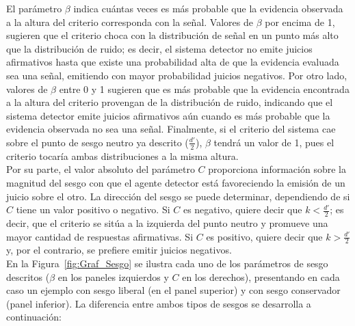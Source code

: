 \begin{itemize}
El parámetro $\beta$ indica cuántas veces es más probable que la evidencia observada a la altura del criterio corresponda con la señal. Valores de $\beta$ por encima de 1, sugieren que el criterio choca con la distribución de señal en un punto más alto que la distribución de ruido; es decir, el sistema detector no emite juicios afirmativos hasta que existe una probabilidad alta de que la evidencia evaluada sea una señal, emitiendo con mayor probabilidad juicios negativos. Por otro lado, valores de $\beta$ entre 0 y 1 sugieren que es más probable que la evidencia encontrada a la altura del criterio provengan de la distribución de ruido, indicando que el sistema detector emite juicios afirmativos aún cuando es más probable que la evidencia observada no sea una señal. Finalmente, si el criterio del sistema cae sobre el punto de sesgo neutro ya descrito ($\frac{d'}{2}$), $\beta$ tendrá un valor de 1, pues el criterio tocaría ambas distribuciones a la misma altura.\\

Por su parte, el valor absoluto del parámetro $C$ proporciona información sobre la magnitud del sesgo con que el agente detector está favoreciendo la emisión de un juicio sobre el otro. La dirección del sesgo se puede determinar, dependiendo de si $C$ tiene un valor positivo o negativo. Si $C$ es negativo, quiere decir que $k < \frac{d'}{2}$; es decir, que el criterio se sitúa a la izquierda del punto neutro y promueve una mayor cantidad de respuestas afirmativas. Si $C$ es positivo, quiere decir que $k > \frac{d'}{2}$ y, por el contrario, se prefiere emitir juicios negativos.\\


En la Figura~\ref{fig:Graf_Sesgo} se ilustra cada uno de los parámetros de sesgo descritos ($\beta$ en los paneles izquierdos y $C$ en los derechos), presentando en cada caso un ejemplo con sesgo liberal (en el panel superior) y con sesgo conservador (panel inferior). La diferencia entre ambos tipos de sesgos se desarrolla a continuación:\\


\end{itemize}
